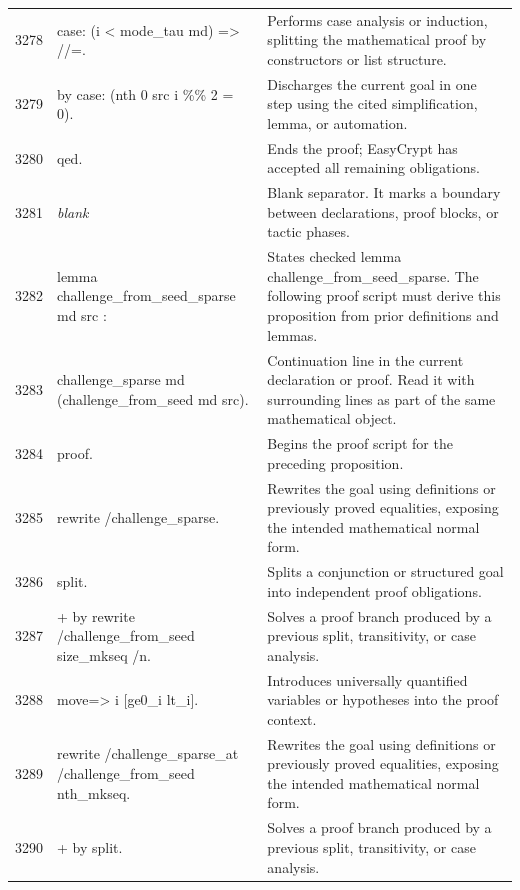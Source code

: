 \documentclass[10pt]{article}
\begin{document}
\begin{longtable}{r L{0.53\textwidth} L{0.37\textwidth}}
3278 & {\ttfamily\scriptsize case: (i < mode\_tau md) => //=.} & Performs case analysis or induction, splitting the mathematical proof by constructors or list structure. \\
3279 & {\ttfamily\scriptsize by case: (nth 0 src i \%\% 2 = 0).} & Discharges the current goal in one step using the cited simplification, lemma, or automation. \\
3280 & {\ttfamily\scriptsize qed.} & Ends the proof; EasyCrypt has accepted all remaining obligations. \\
3281 & {\ttfamily\scriptsize \emph{blank}} & Blank separator.  It marks a boundary between declarations, proof blocks, or tactic phases. \\
3282 & {\ttfamily\scriptsize lemma challenge\_from\_seed\_sparse md src :} & States checked lemma challenge\_from\_seed\_sparse.  The following proof script must derive this proposition from prior definitions and lemmas. \\
3283 & {\ttfamily\scriptsize   challenge\_sparse md (challenge\_from\_seed md src).} & Continuation line in the current declaration or proof.  Read it with surrounding lines as part of the same mathematical object. \\
3284 & {\ttfamily\scriptsize proof.} & Begins the proof script for the preceding proposition. \\
3285 & {\ttfamily\scriptsize rewrite /challenge\_sparse.} & Rewrites the goal using definitions or previously proved equalities, exposing the intended mathematical normal form. \\
3286 & {\ttfamily\scriptsize split.} & Splits a conjunction or structured goal into independent proof obligations. \\
3287 & {\ttfamily\scriptsize + by rewrite /challenge\_from\_seed size\_mkseq /n.} & Solves a proof branch produced by a previous split, transitivity, or case analysis. \\
3288 & {\ttfamily\scriptsize move=> i [ge0\_i lt\_i].} & Introduces universally quantified variables or hypotheses into the proof context. \\
3289 & {\ttfamily\scriptsize rewrite /challenge\_sparse\_at /challenge\_from\_seed nth\_mkseq.} & Rewrites the goal using definitions or previously proved equalities, exposing the intended mathematical normal form. \\
3290 & {\ttfamily\scriptsize + by split.} & Solves a proof branch produced by a previous split, transitivity, or case analysis. \\

\end{longtable}
\end{document}
